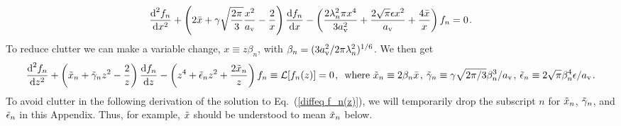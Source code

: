 \documentclass[fleqn,usenatbib]{mnras}
\begin{document}
\begin{equation}
    \dfrac{\textrm{d}^2f_n}{\textrm{d}x^2} + \left( 2 \Bar{x} + \gamma \sqrt{\dfrac{2 \pi}{3}} \dfrac{x^2}{a_{\rm v}} - \dfrac{2}{x} \right)\dfrac{\textrm{d}f_n}{\textrm{d}x} - \left( \dfrac{2 \lambda_n^2 \pi x^4}{3 a_{\rm v}^2} + \dfrac{2 \sqrt{\pi} \epsilon x^2}{ a_{\rm v}} + \dfrac{4\Bar{x}}{x} \right) f_n = 0 \hspace{1 pt} .
\end{equation}
To reduce clutter we can make a variable change, $x \equiv z \beta_n$, with $\beta_n = (3 a_{\rm v}^2/ 2\pi \lambda_n^2)^{1/6}$. We then get
\begin{equation}
    \dfrac{\textrm{d}^2f_n}{\textrm{d}z^2} + \left( \Tilde{x}_n + \Tilde{\gamma}_n z^2 - \dfrac{2}{z} \right)\dfrac{\textrm{d}f_n}{\textrm{d}z} - \left( z^4 + \Tilde{\epsilon}_n z^2 + \dfrac{2\Tilde{x}_n}{z} \right) f_n \equiv \mathcal{L}[f_n(z)] = 0 \hspace{1 pt} , \hspace{5 pt}  \textrm{where} ~ \Tilde{x}_n \equiv 2 \beta_n \Bar{x} \hspace{1 pt} , \hspace{2 pt} \Tilde{\gamma}_n \equiv \gamma \sqrt{2\pi/ 3} \beta_n^3 /a_{\rm v} \hspace{1 pt} , \hspace{2 pt} \Tilde{\epsilon}_n \equiv 2 \sqrt{\pi} \beta_n^4 \epsilon/a_{\rm v}  \hspace{1 pt} \label{diffeq f_n(z)}.
\end{equation}
To avoid clutter in the following derivation of the solution to Eq.~(\ref{diffeq f_n(z)}), we will temporarily drop the subscript $n$ for $\Tilde{x}_n$, $\Tilde{\gamma}_n$, and $\Tilde{\epsilon}_n$ in this Appendix. Thus, for example, $\Tilde{x}$ should be understood to mean $\Tilde{x}_n$ below. 
\end{document}

